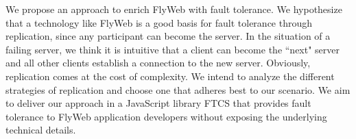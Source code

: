 We propose an approach to enrich FlyWeb with fault tolerance. We hypothesize that a technology like FlyWeb is a good basis for fault tolerance through replication, since any participant can become the server. In the situation of a failing server, we think it is intuitive that a client can become the ``next" server and all other clients establish a connection to the new server. Obviously, replication comes at the cost of complexity. We intend to analyze the different strategies of replication and choose one that adheres best to our scenario. We aim to deliver our approach in a JavaScript library FTCS that provides fault tolerance to FlyWeb application developers without exposing the underlying technical details.